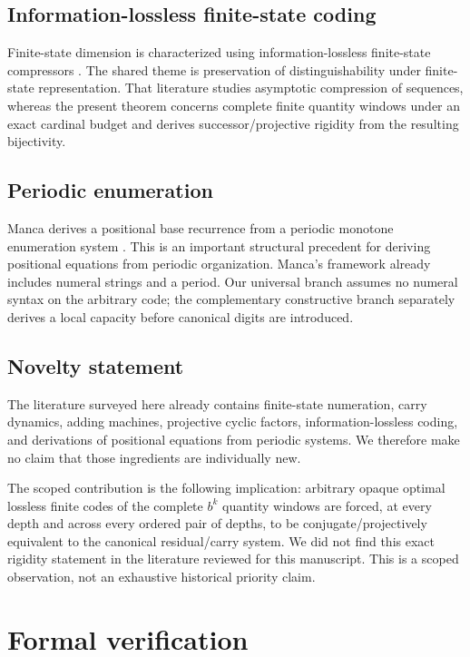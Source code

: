 \documentclass[11pt]{article}
\theoremstyle{definition}
\begin{document}
\subsection{Information-lossless finite-state coding}

Finite-state dimension is characterized using information-lossless finite-state compressors \cite{DaiLathropLutzMayordomo2004}. The shared theme is preservation of distinguishability under finite-state representation. That literature studies asymptotic compression of sequences, whereas the present theorem concerns complete finite quantity windows under an exact cardinal budget and derives successor/projective rigidity from the resulting bijectivity.

\subsection{Periodic enumeration}

Manca derives a positional base recurrence from a periodic monotone enumeration system \cite{Manca2024}. This is an important structural precedent for deriving positional equations from periodic organization. Manca's framework already includes numeral strings and a period. Our universal branch assumes no numeral syntax on the arbitrary code; the complementary constructive branch separately derives a local capacity before canonical digits are introduced.

\subsection{Novelty statement}

The literature surveyed here already contains finite-state numeration, carry dynamics, adding machines, projective cyclic factors, information-lossless coding, and derivations of positional equations from periodic systems. We therefore make no claim that those ingredients are individually new.

The scoped contribution is the following implication: arbitrary opaque optimal lossless finite codes of the complete $b^k$ quantity windows are forced, at every depth and across every ordered pair of depths, to be conjugate/projectively equivalent to the canonical residual/carry system. We did not find this exact rigidity statement in the literature reviewed for this manuscript. This is a scoped observation, not an exhaustive historical priority claim.

\section{Formal verification}
\end{document}
